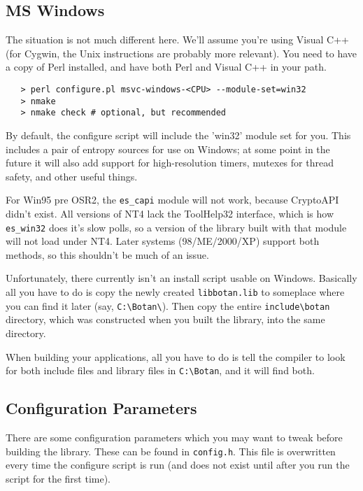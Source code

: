 \documentclass{article}
\newcommand{\filename}[1]{\texttt{#1}}
\begin{document}
\subsection{MS Windows}

The situation is not much different here. We'll assume you're using Visual C++
(for Cygwin, the Unix instructions are probably more relevant). You need to
have a copy of Perl installed, and have both Perl and Visual C++ in your path.

\begin{verbatim}
   > perl configure.pl msvc-windows-<CPU> --module-set=win32
   > nmake
   > nmake check # optional, but recommended
\end{verbatim}

By default, the configure script will include the 'win32' module set for you.
This includes a pair of entropy sources for use on Windows; at some point in
the future it will also add support for high-resolution timers, mutexes for
thread safety, and other useful things.

For Win95 pre OSR2, the \verb|es_capi| module will not work, because CryptoAPI
didn't exist. All versions of NT4 lack the ToolHelp32 interface, which is how
\verb|es_win32| does it's slow polls, so a version of the library built with
that module will not load under NT4. Later systems (98/ME/2000/XP) support both
methods, so this shouldn't be much of an issue.

Unfortunately, there currently isn't an install script usable on
Windows. Basically all you have to do is copy the newly created
\filename{libbotan.lib} to someplace where you can find it later (say,
\verb|C:\Botan\|). Then copy the entire \verb|include\botan| directory, which
was constructed when you built the library, into the same directory.

When building your applications, all you have to do is tell the compiler to
look for both include files and library files in \verb|C:\Botan|, and it will
find both.

\pagebreak

\subsection{Configuration Parameters}

There are some configuration parameters which you may want to tweak before
building the library. These can be found in \filename{config.h}. This file is
overwritten every time the configure script is run (and does not exist until
after you run the script for the first time).
\end{document}
